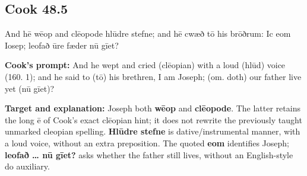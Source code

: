\par\begin{minipage}{\linewidth}\raggedright
\subsection*{Cook 48.5}

And hē wēop and clēopode hlūdre stefne; and hē cwæð tō his brōðrum: Ic eom Iosep; leofað ūre fæder nū gīet?

\textbf{Cook’s prompt:} And he wept and cried (clēopian) with a loud (hlūd) voice (160. 1); and he said to (tō) his brethren, I am Joseph; (om. doth) our father live yet (nū gīet)?

\textbf{Target and explanation:} Joseph both \textbf{wēop} and \textbf{clēopode}. The latter retains the long ē of Cook’s exact clēopian hint; it does not rewrite the previously taught unmarked cleopian spelling. \textbf{Hlūdre stefne} is dative/\allowbreak{}instrumental manner, with a loud voice, without an extra preposition. The quoted \textbf{eom} identifies Joseph; \textbf{leofað … nū gīet?} asks whether the father still lives, without an English-style do auxiliary.

\end{minipage}\par\addvspace{4pt}

